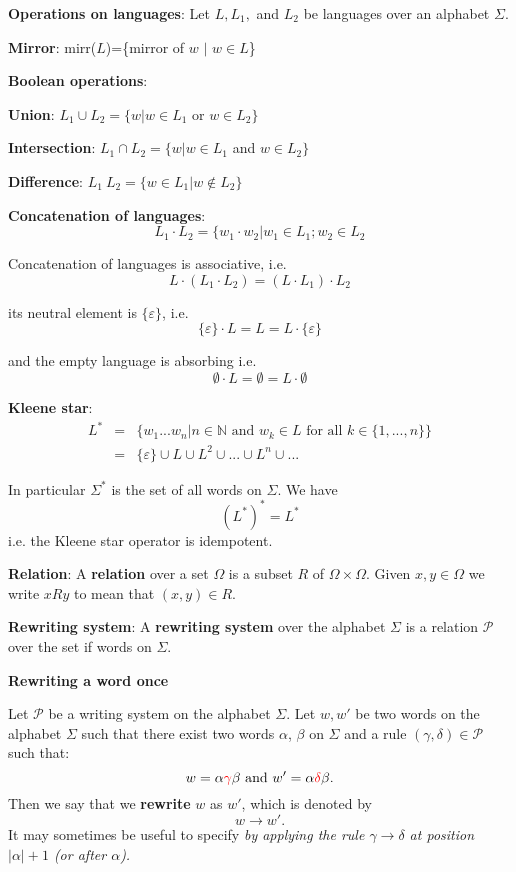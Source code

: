 \documentclass{article}
\newcommand{\defi}[2]{
    \begin{tcolorbox}[
        colback=red!50!yellow!10!white,
        colframe=red!50!yellow
    ]  \textbf{#1}: #2
    \end{tcolorbox}
}
\begin{document}
\defi{Operations on languages}{
Let $L, L_1,$ and $L_2$ be languages over an alphabet $\Sigma$.

\defi{Mirror}{mirr($L$)=\{mirror of $w$ $|$ $w\in L$\}}

\defi{Boolean operations}{
    \defi{Union}{$L_1\cup L_2 = \{w | w\in L_1$ or $w\in L_2 \}$}
    \defi{Intersection}{$L_1\cap L_2 =\{ w | w\in L_1$ and $w\in L_2\}$}
    \defi{Difference}{$L_1 \ L_2 = \{w\in L_1 | w\notin L_2\}$}
}

\defi{Concatenation of languages}{$$L_1\cdot L_2 = \{ w_1\cdot w_2 | w_1\in L_1; w_2\in L_2$$

Concatenation of languages is associative, i.e. $$L\cdot (L_1\cdot L_2 ) = (L\cdot L_1 )\cdot L_2$$

its neutral element is $\{\varepsilon\}$, i.e. $$\{\varepsilon\}\cdot L = L = L\cdot \{\varepsilon\}$$

and the empty language is absorbing i.e. $$\emptyset\cdot L = \emptyset = L\cdot\emptyset$$}

\defi{Kleene star}{$$\begin{array}{ccc}L^* & = & \{w_1...w_n | n\in\mathbb{N}\text{ and } w_k\in L \text{ for all } k\in\{1,...,n\}\} \\
& = & \{\varepsilon\}\cup L\cup L^2\cup...\cup L^n\cup ...\end{array}$$

In particular $\Sigma^*$ is the set of all words on $\Sigma$. We have $$(L^*)^* = L^*$$ i.e. the Kleene star operator is idempotent.
}
}

\defi{Relation}{A \textbf{relation} over a set $\Omega$ is a subset $R$ of $\Omega\times\Omega$. Given $x,y\in\Omega$ we write $xRy$ to mean that $(x,y)\in R$.}

\defi{Rewriting system}{A \textbf{rewriting system} over the alphabet $\Sigma$ is a relation $\mathcal{P}$ over the set if words on $\Sigma$.}

\vspace{10pt}

\textbf{Rewriting a word once}

\noindent Let $\mathcal{P}$ be a writing system on the alphabet $\Sigma$. Let $w, w'$ be two words on the alphabet $\Sigma$ such that there exist two words $\alpha$, $\beta$ on $\Sigma$ and a rule $(\gamma, \delta)\in\mathcal{P}$ such that: $$w = \alpha\textcolor{red}{\gamma}\beta \text{ and } w' = \alpha\textcolor{red}{\delta}\beta.$$
Then we say that we \textbf{rewrite} $w$ as $w'$, which is denoted by $$w\rightarrow w'.$$
It may sometimes be useful to specify \textit{by applying the rule $\gamma\rightarrow\delta$ at position $|\alpha | + 1$ (or after $\alpha$).}
\end{document}
